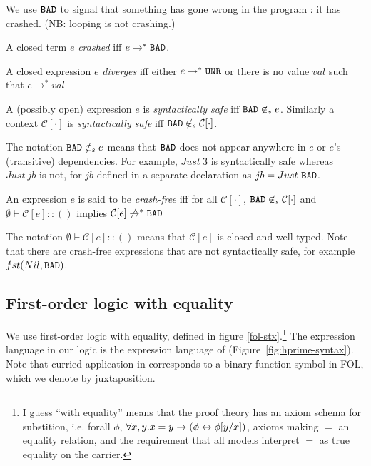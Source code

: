 \documentclass[preprint]{sigplanconf}
\begin{document}
We use $\texttt{BAD}$ to signal that something has gone wrong in the program :
it has crashed. (NB: looping is not crashing.)

\begin{definition}[Crash]
A closed term $e$ \emph{crashed} iff $e \to^* \texttt{BAD}$.
\end{definition}

\begin{definition}[Diverges]
A closed expression $e$ \emph{diverges} iff either $e \to^* \texttt{UNR}$ or there is
no value $val$ such that $e \to^* val$
\end{definition}

\begin{definition}
A (possibly open) expression $e$ is \emph{syntactically safe} iff $\texttt{BAD} \not
\in_s e$. Similarly a context $\mathcal{C}[\cdot]$ is \emph{syntactically safe} iff $\texttt{BAD}
\not \in_s \mathcal{C}[\cdot]$.
\end{definition}

The notation $\texttt{BAD} \notin_s e$ means that $\texttt{BAD}$ does not appear
anywhere in $e$ or $e$'s (transitive) dependencies.  For
example, $Just ~3$ is syntactically safe whereas $Just ~jb$ is 
not, for $jb$ defined in a separate declaration as $jb = Just~\texttt{BAD}$.

\begin{definition}\label{def:cf}
An expression $e$ is said to be \emph{crash-free} iff 
for all $\mathcal{C}[\cdot]$, $\texttt{BAD} \not \in_s \mathcal{C}[\cdot]$ and $\emptyset \vdash
\mathcal{C}[e] :: ()$ implies $\mathcal{C}[e] \not \to^* \texttt{BAD}$
\end{definition}
The notation $\emptyset \vdash \mathcal{C}[e] :: ()$ means that
$\mathcal{C}[e]$ is closed and well-typed.  Note
that there are crash-free expressions that are not syntactically safe,
for example $fst(Nil,\texttt{BAD})$.


\subsection{First-order logic with equality}
We use first-order logic with equality, defined in figure \ref{fol-stx}.\footnote{
%
I guess ``with equality'' means that the proof theory has an axiom schema for substition, i.e. forall $\phi$, $\forall x,y.x=y \to (\phi \leftrightarrow \phi[y/x])$, axioms making $=$ an equality relation, and the requirement that all models interpret $=$ as true equality on the carrier.
%
}
The expression language in our logic is the expression language of 
\hprime (Figure~\ref{fig:hprime-syntax}).  Note that curried application in \hprime
corresponds to a binary function symbol in FOL, which we denote by juxtaposition.
\end{document}

